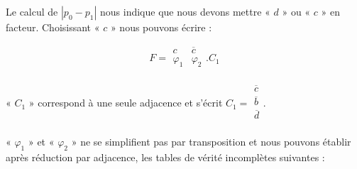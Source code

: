 Le calcul de $| p_0 - p_1|$ nous indique que nous devons mettre « $d$ » ou « $c$ » en facteur. Choisissant « $c$ » nous pouvons écrire : 

\medskip

\[ F =
\begin{array}{|c|c|}  c & \overline{c} \\ \varphi_1 &   \varphi_2 \\     \end{array} . C_1 
\]

\medskip 

« $C_1$ » correspond à une seule adjacence et s'écrit $ C_1 =  \begin{array}{|c|} \overline{c} \\ \overline{b} \\ \overline{d} \\ \end{array}$.

\medskip 

« $\varphi_1$ » et « $\varphi_2$ » ne se simplifient pas par transposition et nous pouvons établir après réduction par adjacence, les tables de vérité incomplètes suivantes : 

\medskip 


                                  
                                  
